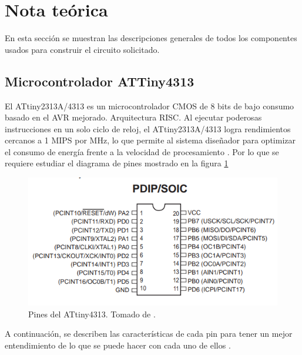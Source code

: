 \section{Nota teórica}
En esta sección se muestran las descripciones generales de todos los componentes usados para construir el circuito solicitado.
\subsection*{Microcontrolador ATTiny4313}
El ATtiny2313A/4313 es un microcontrolador CMOS de 8 bits de bajo consumo basado en el AVR mejorado.
Arquitectura RISC. Al ejecutar poderosas instrucciones en un solo ciclo de reloj, el ATtiny2313A/4313 logra rendimientos cercanos a 1 MIPS por MHz, lo que permite al sistema diseñador para optimizar el consumo de energía frente a la velocidad de procesamiento \cite{web}. Por lo que se requiere estudiar el diagrama de pines mostrado en la figura \ref{fig1}
\begin{figure}[H]
\centering
\includegraphics[width=.8\linewidth]{Imagenes/1.png}
 \caption{Pines del ATtiny4313. Tomado de \cite{web}.}
 \label{fig1}
\end{figure}
A continuación, se describen las características de cada pin para tener un mejor entendimiento de lo que se puede hacer con cada uno de ellos \cite{web}.
